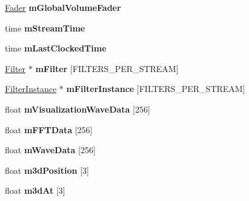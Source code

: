 \begin{DoxyCompactItemize}
\mbox{\hyperlink{class_so_loud_1_1_fader}{Fader}} {\bfseries m\+Global\+Volume\+Fader}
\item 
\mbox{\label{class_so_loud_1_1_soloud_addf4c4028743a2c8e0716d4e2c0b426d}} 
time {\bfseries m\+Stream\+Time}
\item 
\mbox{\label{class_so_loud_1_1_soloud_a4588c3dfa72546c958f34b2996e2234d}} 
time {\bfseries m\+Last\+Clocked\+Time}
\item 
\mbox{\label{class_so_loud_1_1_soloud_abf2fc714c822777f5b097e8995c5467f}} 
\mbox{\hyperlink{class_so_loud_1_1_filter}{Filter}} $\ast$ {\bfseries m\+Filter} \mbox{[}F\+I\+L\+T\+E\+R\+S\+\_\+\+P\+E\+R\+\_\+\+S\+T\+R\+E\+AM\mbox{]}
\item 
\mbox{\label{class_so_loud_1_1_soloud_ada3f485c7299b9e298ed25410e685b64}} 
\mbox{\hyperlink{class_so_loud_1_1_filter_instance}{Filter\+Instance}} $\ast$ {\bfseries m\+Filter\+Instance} \mbox{[}F\+I\+L\+T\+E\+R\+S\+\_\+\+P\+E\+R\+\_\+\+S\+T\+R\+E\+AM\mbox{]}
\item 
\mbox{\label{class_so_loud_1_1_soloud_a4b4a23f7f3d81215f02859c84bc82faf}} 
float {\bfseries m\+Visualization\+Wave\+Data} \mbox{[}256\mbox{]}
\item 
\mbox{\label{class_so_loud_1_1_soloud_a08be438dc2041cdc27ffa91233f05d20}} 
float {\bfseries m\+F\+F\+T\+Data} \mbox{[}256\mbox{]}
\item 
\mbox{\label{class_so_loud_1_1_soloud_ad22b348e26af7704e8b695248affe534}} 
float {\bfseries m\+Wave\+Data} \mbox{[}256\mbox{]}
\item 
\mbox{\label{class_so_loud_1_1_soloud_a46c057aa782288cc8ebb1683ee36ebfa}} 
float {\bfseries m3d\+Position} \mbox{[}3\mbox{]}
\item 
\mbox{\label{class_so_loud_1_1_soloud_a7071d7489c03f948be85b2b5113ee6e8}} 
float {\bfseries m3d\+At} \mbox{[}3\mbox{]}
\item 
\mbox{\label{class_so_loud_1_1_soloud_ab49bd2198536ce51f31c79bc61732086}} 

\end{DoxyCompactItemize}
